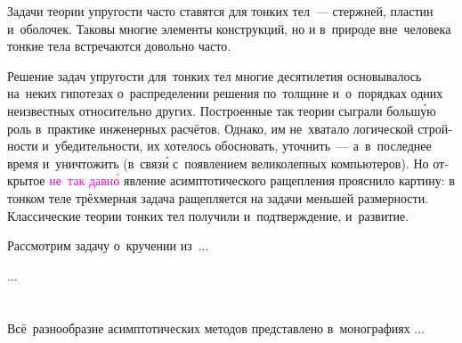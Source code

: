 \begin{otherlanguage}{russian}

Задачи теории упругости часто ставятся для тонких тел~--- стержней, пластин и~оболочек. Таковы многие элементы конструкций, но и в~природе вне~человека тонкие тела встречаются довольно часто.

Решение задач упругости для~тонких тел многие десятилетия основывалось на~неких гипотезах о~распределении решения по~толщине и~о~порядках одних неизвестных относительно других. Построенные так теории сыграли больш\'{у}ю роль в~практике инженерных расчётов. Однако, им не~хватало логической стройности и~убедительности, их хотелось обосновать, уточнить~--- а~в~последнее время и~уничтожить (в~связ\'{и} с~появлением великолепных компьютеров). Но открытое \textcolor{magenta}{не~так давн\'{о}} явление асимптотического ращепления прояснило картину: в тонком теле трёхмерная задача ращепляется на задачи меньшей размерности. Классические теории тонких тел получили и~подтверждение, и~развитие.

Рассмотрим задачу о~кручении из~...

...





\vspace{8mm}
\hfill\begin{minipage}[b]{0.95\linewidth}
\fontsize{10}{12}\selectfont

\section*{\wordforbibliography}

Всё~разнообразие асимптотических методов представлено в~монографиях ...

\end{minipage}

\end{otherlanguage}

